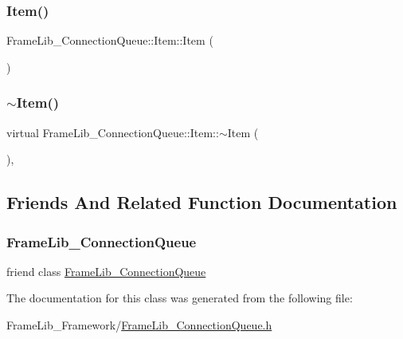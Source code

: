 \subsubsection{\texorpdfstring{Item()}{Item()}}
{\footnotesize\ttfamily Frame\+Lib\+\_\+\+Connection\+Queue\+::\+Item\+::\+Item (\begin{DoxyParamCaption}{ }\end{DoxyParamCaption})\hspace{0.3cm}{\ttfamily [inline]}}

\mbox{\label{class_frame_lib___connection_queue_1_1_item_ac9363ad9ab0ad0ed00037e27c691ee8d}} 
\subsubsection{\texorpdfstring{$\sim$\+Item()}{~Item()}}
{\footnotesize\ttfamily virtual Frame\+Lib\+\_\+\+Connection\+Queue\+::\+Item\+::$\sim$\+Item (\begin{DoxyParamCaption}{ }\end{DoxyParamCaption})\hspace{0.3cm}{\ttfamily [inline]}, {\ttfamily [virtual]}}



\subsection{Friends And Related Function Documentation}
\mbox{\label{class_frame_lib___connection_queue_1_1_item_a5ef3645eb1ddfdf5e50dfe9a9fe7a997}} 
\subsubsection{\texorpdfstring{Frame\+Lib\+\_\+\+Connection\+Queue}{FrameLib\_ConnectionQueue}}
{\footnotesize\ttfamily friend class \hyperlink{class_frame_lib___connection_queue}{Frame\+Lib\+\_\+\+Connection\+Queue}\hspace{0.3cm}{\ttfamily [friend]}}



The documentation for this class was generated from the following file\+:\begin{DoxyCompactItemize}
\item 
Frame\+Lib\+\_\+\+Framework/\hyperlink{_frame_lib___connection_queue_8h}{Frame\+Lib\+\_\+\+Connection\+Queue.\+h}\end{DoxyCompactItemize}

